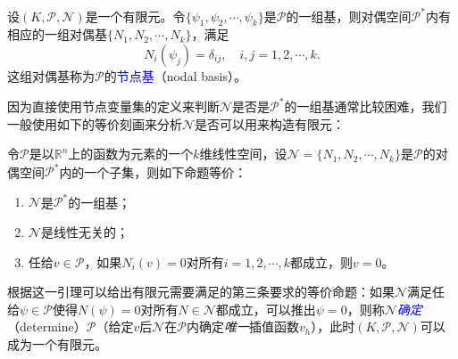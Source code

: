 \documentclass[a4paper,10pt]{ctexart}
\begin{document}
\begin{definition}
    设$ (K,\mathcal{P},\mathcal{N}) $是一个有限元。令$ \{\psi_1,\psi_2,\cdots ,\psi_k\} $是$ \mathcal{P} $的一组基，则对偶空间$ \mathcal{P}^* $内有相应的一组对偶基$ \{N_1,N_2,\cdots ,N_k\} $，满足
    \begin{equation}
        N_i(\psi_j) = \delta_{ij},\quad i,j = 1,2,\cdots ,k.
    \end{equation}
    这组对偶基称为$ \mathcal{P} $的\textcolor{blue}{节点基}（nodal basis）。
\end{definition}

因为直接使用节点变量集的定义来判断$ \mathcal{N} $是否是$ \mathcal{P}^* $的一组基通常比较困难，我们一般使用如下的等价刻画来分析$ \mathcal{N} $是否可以用来构造有限元：
\begin{lemma}
    令$ \mathcal{P} $是以$ \mathbb{R}^n $上的函数为元素的一个$ k $维线性空间，设$ \mathcal{N} = \{N_1,N_2,\cdots ,N_k\} $是$ \mathcal{P} $的对偶空间$ \mathcal{P}^* $内的一个子集，则如下命题等价：
    \begin{enumerate}
        \item $ \mathcal{N} $是$ \mathcal{P}^* $的一组基；
        \item $ \mathcal{N} $是线性无关的；
        \item 任给$ v\in \mathcal{P} $，如果$ N_i(v) = 0 $对所有$ i = 1,2,\cdots ,k $都成立，则$ v = 0 $。
    \end{enumerate}
\end{lemma}
\noindent 根据这一引理可以给出有限元需要满足的第三条要求的等价命题：如果$ \mathcal{N} $满足任给$ \psi\in \mathcal{P} $使得$ N(\psi) = 0 $对所有$ N\in \mathcal{N} $都成立，可以推出$ \psi = 0 $，则称$ \mathcal{N} $\textcolor{blue}{\emph{确定}}（determine）$ \mathcal{P} $（给定$ v $后$ \mathcal{N} $在$ \mathcal{P} $内确定\emph{唯一}插值函数$ v_h $），此时$ (K,\mathcal{P},\mathcal{N}) $可以成为一个有限元。
\end{document}

